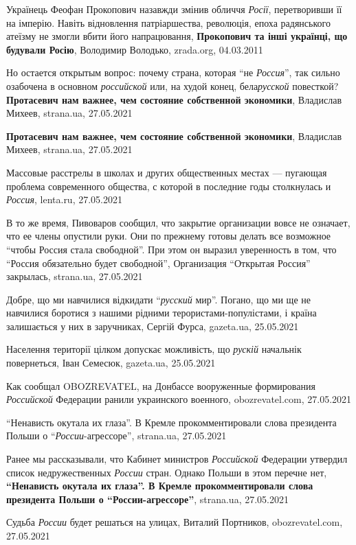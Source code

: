 Українець Феофан Прокопович назавжди змінив обличчя \emph{Росії}, перетворивши
її на імперію. Навіть відновлення патріаршества, революція, епоха радянського
атеїзму не змогли вбити його напрацювання, \textbf{Прокопович та інші українці,
що будували Росію}, Володимир Володько, zrada.org, 04.03.2011

Но остается открытым вопрос: почему страна, которая \enquote{не \emph{Россия}},
так сильно озабочена в основном \emph{российской} или, на худой конец,
бела\emph{русской} повесткой?
\textbf{Протасевич нам важнее, чем состояние собственной экономики}, Владислав Михеев, 
strana.ua, 27.05.2021

\textbf{Протасевич нам важнее, чем состояние собственной экономики}, Владислав Михеев, 
strana.ua, 27.05.2021

Массовые расстрелы в школах и других общественных местах — пугающая проблема
современного общества, с которой в последние годы столкнулась и \emph{Россия},
lenta.ru, 27.05.2021

В то же время, Пивоваров сообщил, что закрытие организации вовсе не означает,
что ее члены опустили руки. Они по прежнему готовы делать все возможное
\enquote{чтобы Россия стала свободной}. При этом он выразил уверенность в том,
что \enquote{Россия обязательно будет свободной}, Организация \enquote{Открытая
Россия} закрылась, strana.ua, 27.05.2021

Добре, що ми навчилися відкидати \enquote{\emph{русский} мир}. Погано, що ми ще
не навчилися боротися з нашими рідними терористами-популістами, і країна
залишається у них в заручниках, Сергій Фурса, gazeta.ua, 25.05.2021

Населення території цілком допускає можливість, що \emph{рускій} начальнік
повернеться, Іван Семесюк, gazeta.ua, 25.05.2021

Как сообщал OBOZREVATEL, на Донбассе вооруженные формирования \emph{Российской}
Федерации ранили украинского военного, obozrevatel.com, 27.05.2021

\enquote{Ненависть окутала их глаза}. В Кремле прокомментировали слова
президента Польши о \enquote{\emph{России}-агрессоре}, strana.ua, 27.05.2021

Ранее мы рассказывали, что Кабинет министров \emph{Российской} Федерации
утвердил список недружественных \emph{России} стран. Однако Польши в этом
перечне нет, \textbf{\enquote{Ненависть окутала их глаза}. В Кремле
прокомментировали слова президента Польши о \enquote{России-агрессоре}},
strana.ua, 27.05.2021

Судьба \emph{России} будет решаться на улицах, Виталий Портников,
obozrevatel.com, 27.05.2021

